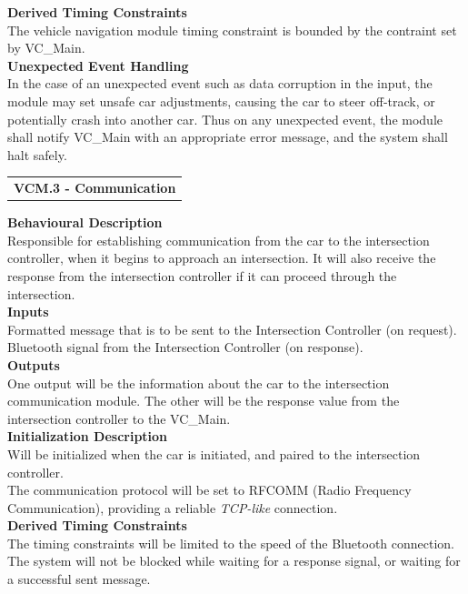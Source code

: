 \documentclass [10pt]{article}
\begin{document}
\textbf{Derived Timing Constraints} \\
The vehicle navigation module timing constraint is bounded by the contraint set by VC\_Main. \\

\textbf{Unexpected Event Handling} \\
    In the case of an unexpected event such as data corruption in the input, the module may set unsafe car adjustments, causing the car to steer off-track, or potentially crash into another car. Thus on any unexpected event, the module shall notify VC\_Main with an appropriate error message, and the system shall halt safely.  \\
    


\begin{longtable}{p{}}
\rowcolor{tableCell}\textbf{VCM.3 - Communication} \\
\end{longtable}

\textbf{Behavioural Description} \\
Responsible for establishing communication from the car to the intersection controller, when it begins to approach an intersection. It will also receive the response from the intersection controller if it can proceed through the intersection. 
\\

\textbf{Inputs} \\
    Formatted message that is to be sent to the Intersection Controller (on request). \\
    Bluetooth signal from the Intersection Controller (on response). \\

\textbf{Outputs} \\
    One output will be the information about the car to the intersection communication module. 
    The other will be the response value from the intersection controller to the VC\_Main.\\

\textbf{Initialization Description} \\
 Will be initialized when the car is initiated, and paired to the intersection controller.\\
 The communication protocol will be set to RFCOMM (Radio Frequency Communication), providing a reliable \textit{TCP-like} connection. \\ 

\textbf{Derived Timing Constraints} \\
The timing constraints will be limited to the speed of the Bluetooth connection.
The system will not be blocked while waiting for a response signal, or waiting for a successful sent message.\\
\end{document}
